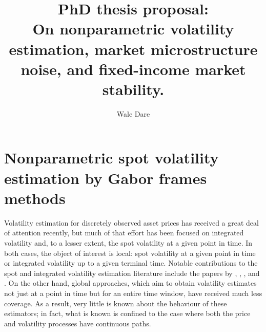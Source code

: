 
\usepackage[toc,page]{appendix}
\newcommand{\sumn}{\ensuremath{\sum_{k \in \nats}}\xspace}
\newcommand{\sumi}{\ensuremath{\sum_{k \in \ints}}\xspace}
\newcommand{\sumt}{\ensuremath{\sum_{(h,k) \in \Theta_n}}\xspace}
\newcommand{\sv}{\ensuremath{\sigma_t^2}\xspace}
\newcommand{\bsv}{\ensuremath{\bar{\sigma}^2}\xspace}
\newcommand{\svnt}{\ensuremath{\sigma^2}\xspace}
\newcommand{\svhk}{\ensuremath{\sigma^2_{h,k}}\xspace}
\newcommand{\vh}{\ensuremath{V_h(\phi)}\xspace}
\newcommand{\idp}{\ensuremath{\mu}\xspace}
\newcommand{\svn}{\ensuremath{\hat{\sigma}_{n}^2}\xspace}
\newcommand{\Svn}{\ensuremath{\hat{\Sigma}_n}\xspace}
\newcommand{\svnb}{\ensuremath{\hat{\sigma}_{n,b}^2}\xspace}
\newcommand{\svnN}{\ensuremath{\hat{\sigma}_{t}^2}\xspace}
\newcommand{\hs}{\ensuremath{\mcal{H}}\xspace}
\newcommand{\T}{\ensuremath{\tau}\xspace}
\newcommand{\chk}{\ensuremath{{c}_{h,k}}\xspace}
\newcommand{\cnhk}{\ensuremath{\hat{c}_{h,k}}\xspace}
\newcommand{\ivp}{\ensuremath{\sigma}\xspace}
\newcommand{\inner}[2]{\ensuremath{\langle{#1},{#2}\rangle}\xspace}
\newcommand{\ghk}{\ensuremath{g_{h,k}}\xspace}
\newcommand{\tghk}{\ensuremath{\tilde{g}_{h,k}}\xspace}
\newcommand{\btghki}{\ensuremath{\overline{\tilde{g}_{h,k}(t_i)}}\xspace}
\newcommand{\btghks}{\ensuremath{\overline{\tilde{g}_{h,k}(s)}}\xspace}
\newcommand{\tg}{\ensuremath{\tilde{g}}\xspace}
\newcommand{\hkints}{\ensuremath{h,k \in \ints}\xspace}
\title{PhD thesis proposal: \\ On nonparametric  volatility estimation, market microstructure noise, and fixed-income market stability.}
\author{Wale Dare}

\maketitle
\tableofcontents
\chapter {Nonparametric spot volatility estimation by Gabor frames methods}
Volatility estimation for discretely observed asset prices has received a great deal of attention recently, but much of that effort has been focused on 
integrated volatility and, to a lesser extent, the spot volatility at a given point in time. In both cases, the object of interest is local: spot volatility at a given point in time or integrated volatility up to a given terminal time.  Notable contributions to the spot and integrated volatility estimation literature include  the papers by \cite{Foster1996}, \cite{Fan2008},   \cite{Florens1993}, and  \cite{BN2004}. On the other hand,  global approaches, which aim  to obtain  volatility estimates not just at a point in time but for an entire time window,  have received much less coverage. As a result, very little is known about the behaviour of these estimators; in fact, what is known is confined to the case where both the price and volatility processes have continuous paths.      


